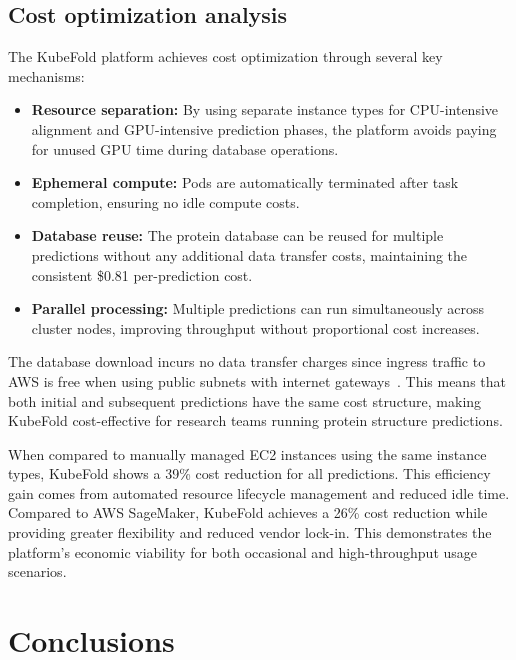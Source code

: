 \subsection{Cost optimization analysis}

The KubeFold platform achieves cost optimization through several key mechanisms:

\begin{itemize}
    \item \textbf{Resource separation:} By using separate instance types for CPU-intensive alignment and GPU-intensive prediction phases, the platform avoids paying for unused GPU time during database operations.
    
    \item \textbf{Ephemeral compute:} Pods are automatically terminated after task completion, ensuring no idle compute costs.
    
    \item \textbf{Database reuse:} The protein database can be reused for multiple predictions without any additional data transfer costs, maintaining the consistent \$0.81 per-prediction cost.
    
    \item \textbf{Parallel processing:} Multiple predictions can run simultaneously across cluster nodes, improving throughput without proportional cost increases.
\end{itemize}

The database download incurs no data transfer charges since ingress traffic to AWS is free when using public subnets with internet gateways~\cite{aws-ec2-pricing}. This means that both initial and subsequent predictions have the same cost structure, making KubeFold cost-effective for research teams running protein structure predictions.

When compared to manually managed EC2 instances using the same instance types, KubeFold shows a 39\% cost reduction for all predictions. This efficiency gain comes from automated resource lifecycle management and reduced idle time. Compared to AWS SageMaker, KubeFold achieves a 26\% cost reduction while providing greater flexibility and reduced vendor lock-in. This demonstrates the platform's economic viability for both occasional and high-throughput usage scenarios.

\section{Conclusions}

